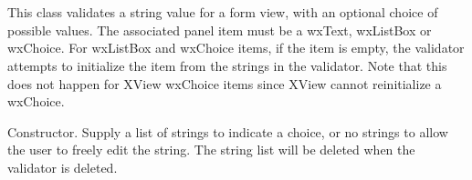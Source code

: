 \section{}\label{wxstringformvalidator}

This class validates a string value for a form view, with an optional choice of possible values.
The associated panel item must be a wxText, wxListBox or wxChoice. For wxListBox and wxChoice items,
if the item is empty, the validator attempts to initialize the item from the strings in
the validator. Note that this does not happen for XView wxChoice items since XView cannot reinitialize a wxChoice.






Constructor. Supply a list of strings to indicate a choice, or no strings to allow the
user to freely edit the string. The string list will be deleted when the validator is deleted.

